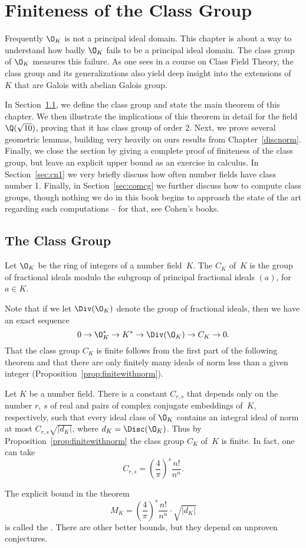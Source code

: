 \chapter{Finiteness of the Class Group}\label{ch:classgroup}
Frequently $\O_K$ is not a principal ideal domain.  This chapter is
about a way to understand how badly $\O_K$ fails to be a principal
ideal domain.  The class group of $\O_K$ measures this failure.  As
one sees in a course on Class Field Theory, the class group and its
generalizations also yield deep insight into the
extensions of~$K$ that are Galois with abelian Galois group.

In Section~\ref{sec:theclassgroup}, we define the class group and
state the main theorem of this chapter.  We then illustrate the
implications of this theorem in detail for the field $\Q(\sqrt{10})$,
proving that it has class group of order $2$. Next, we prove several
geometric lemmas, building very heavily on ours results from
Chapter~\ref{discnorm}.  Finally, we close the section by giving a
complete proof of finiteness of the class group, but leave an explicit
upper bound as an exercise in calculus.  In Section~\ref{sec:cn1} we
very briefly discuss how often number fields have class number 1.
Finally, in Section~\ref{sec:comcg} we further discuss how to compute
class groups, though nothing we do in this book begins to approach the
state of the art regarding such computations -- for that, see Cohen's
books.

\section{The Class Group}\label{sec:theclassgroup}
\begin{definition}
Let $\O_K$ be the ring of integers of a number field~$K$.  The
 $C_K$ of~$K$ is the group of fractional ideals
modulo the subgroup of principal fractional ideals $(a)$, for $a\in K$.
\end{definition}

Note that if we let $\Div(\O_K)$ denote the group of  fractional
ideals, then we have an exact sequence
$$
  0 \to \O_K^* \to K^* \to \Div(\O_K) \to C_K \to 0.
$$
That the class group $C_K$ is finite follows from the first part of
the following theorem and that there are only finitely many
ideals of norm less than a given integer (Proposition~\ref{prop:finitewithnorm}).
\begin{theorem}\label{thm:finiteclassgrp}
Let $K$ be a number field.  There is a constant $C_{r,s}$ that
depends only on the number $r$, $s$ of real and pairs
of complex conjugate embeddings of~$K$, respectively, such that
every ideal class of $\O_K$ contains an integral ideal
of norm at most $C_{r,s}\sqrt{|d_K|}$, where
$d_K=\Disc(\O_K)$.
Thus by Proposition~\ref{prop:finitewithnorm}
the class group $C_K$ of~$K$ is
finite.
In fact, one can take
$$C_{r,s} = \left(\frac{4}{\pi}\right)^s\frac{n!}{n^n}.$$
\end{theorem}
The explicit bound in the theorem
$$M_K = \left(\frac{4}{\pi}\right)^s\frac{n!}{n^n} \cdot \sqrt{|d_K|}$$
is called the .  There are other better bounds, but they depend on unproven
conjectures.

